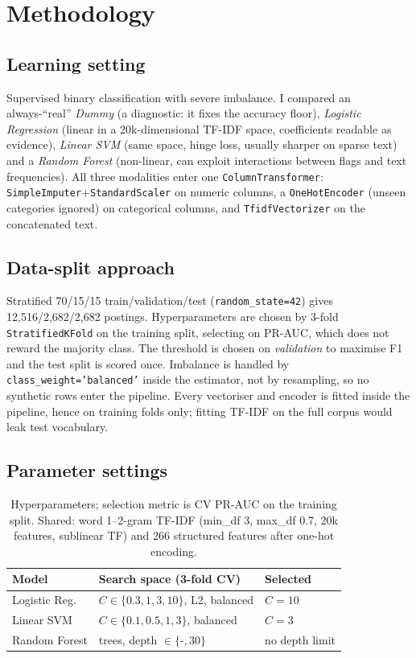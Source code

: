 \documentclass[10pt,conference]{IEEEtran}
\begin{document}
\section{Methodology}
\subsection{Learning setting}
Supervised binary classification with severe imbalance. I compared an always-``real''
\emph{Dummy} (a diagnostic: it fixes the accuracy floor), \emph{Logistic Regression}
(linear in a 20k-dimensional TF-IDF space, coefficients readable as evidence),
\emph{Linear SVM} (same space, hinge loss, usually sharper on sparse text) and a
\emph{Random Forest} (non-linear, can exploit interactions between flags and text
frequencies). All three modalities enter one \texttt{ColumnTransformer}:
\texttt{SimpleImputer}+\texttt{StandardScaler} on numeric columns, a
\texttt{OneHotEncoder} (unseen categories ignored) on categorical columns, and
\texttt{TfidfVectorizer} on the concatenated text.

\subsection{Data-split approach}
Stratified 70/15/15 train/validation/test (\texttt{random\_state=42}) gives
12,516/2,682/2,682 postings. Hyperparameters are chosen by 3-fold
\texttt{StratifiedKFold} on the training split, selecting on PR-AUC, which does not reward
the majority class. The threshold is chosen on \emph{validation} to maximise F1 and the test
split is scored once. Imbalance is handled by \texttt{class\_weight='balanced'} inside the
estimator, not by resampling, so no synthetic rows enter the pipeline. Every vectoriser and
encoder is fitted inside the pipeline, hence on training folds only; fitting TF-IDF on the
full corpus would leak test vocabulary.

\subsection{Parameter settings}

\begin{table}[t]
\centering
\caption{Hyperparameters; selection metric is CV PR-AUC on the training split. Shared: word 1--2-gram TF-IDF (min\_df 3, max\_df 0.7, 20k features, sublinear TF) and 266 structured features after one-hot encoding.}
\label{tab:hp}
\scriptsize
\begin{tabular}{>{\raggedright\arraybackslash}p{1.45cm}>{\raggedright\arraybackslash}p{3.35cm}>{\raggedright\arraybackslash}p{1.5cm}}
\toprule
Model & Search space (3-fold CV) & Selected \\
\midrule
Logistic Reg. & $C\in\{0.3,1,3,10\}$, L2, balanced & $C=10$ \\
Linear SVM & $C\in\{0.1,0.5,1,3\}$, balanced & $C=3$ \\
Random Forest & 300 trees, depth $\in\{$-$,30\}$ & no depth limit \\
\bottomrule
\end{tabular}
\end{table}
\end{document}
